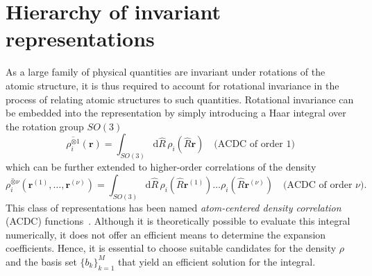 \section{Hierarchy of invariant representations}
As a large family of physical quantities are invariant under rotations of the atomic structure, it is thus required to account for rotational invariance in the process of relating atomic structures to such quantities.
Rotational invariance can be embedded into the representation by simply introducing a Haar integral over the rotation group $SO(3)$
\begin{equation}
\label{eq:integration_over_subgroup}
\overline{\rho_i^{\otimes 1}}(\mathbf{r}) = \int_{SO(3)}\mathrm{d}\hat{R}\, \rho_i(\hat{R}\mathbf{r})\quad\textrm{(ACDC of order 1)}
\end{equation}
which can be further extended to higher-order correlations of the density
\begin{equation}
\label{eq:integration_over_subgroup_higher_order}
\overline{\rho_i^{\otimes\nu}}(\mathbf{r}^{(1)},\ldots, \mathbf{r}^{(\nu)}) = \int_{SO(3)}\mathrm{d}\hat{R}\, \rho_i(\hat{R}\mathbf{r}^{(1)})\ldots\rho_i(\hat{R}\mathbf{r}^{(\nu)})\quad\textrm{(ACDC of order $\nu$)}.
\end{equation}
This class of representations has been named \emph{atom-centered density correlation} (ACDC) functions~\cite{nigam2022unified}.
Although it is theoretically possible to evaluate this integral numerically, it does not offer an efficient means to determine the expansion coefficients.
Hence, it is essential to choose suitable candidates for the density $\rho$ and the basis set $\{b_k\}_{k=1}^M$ that yield an efficient solution for the integral.

